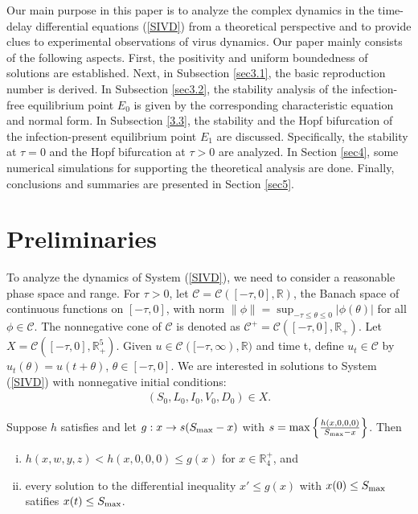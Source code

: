 \documentclass{CMHPhD-SIVD}
\begin{document}
Our main purpose in this paper is to analyze the complex dynamics in the time-delay differential equations (\ref{SIVD}) from a theoretical perspective and to provide clues to experimental observations of virus dynamics. Our paper mainly consists of the following aspects. First, the positivity and uniform boundedness of solutions are established. Next, in Subsection \ref{sec3.1}, the basic reproduction number is derived. In Subsection \ref{sec3.2}, the stability analysis of the infection-free equilibrium point $E_0$ is given by the corresponding characteristic equation and normal form. In Subsection \ref{3.3}, the stability and the Hopf bifurcation of the  infection-present equilibrium point $E_1$ are discussed. Specifically, the stability at $\tau=0$ and the Hopf bifurcation at $\tau>0$ are analyzed. In Section \ref{sec4}, some numerical simulations for supporting the theoretical analysis are done. Finally, conclusions and summaries are presented in Section \ref{sec5}.




\section{Preliminaries}
To analyze the dynamics of System (\ref{SIVD}), we need to consider a reasonable phase space and range. For $\tau>0$, let $\mathscr{C}=\mathcal{C}([-\tau,0],\mathbb{R})$, the Banach space of continuous functions on $[-\tau,0]$, with norm $\|\phi\|=\sup_{-\tau\leq\theta\leq0}|\phi(\theta)|$ for all $\phi\in\mathscr{C}$. The nonnegative cone of $\mathscr{C}$ is denoted as $\mathscr{C}^+=\mathcal{C}([-\tau,0],\mathbb{R}_+)$. Let $X=\mathcal{C}([-\tau,0],\mathbb{R}^5_+)$. Given $u\in\mathcal{C}([-\tau,\infty),\mathbb{R})$ and time t, define $u_t\in\mathscr{C}$ by $u_t(\theta) = u(t+\theta)$, $\theta\in[-\tau,0]$.
We are interested in solutions to System (\ref{SIVD}) with nonnegative initial conditions:
\begin{align*}
(S_0, L_0, I_0, V_0, D_0) \in X.
\end{align*}

\begin{lemma}\label{2.1}
Suppose $h$ satisfies 
and let $g:x\to s(S_{\text{max}}-x)$ with $s=\max\left\{\frac{h(x,0,0,0)}{S_{\text{max}}-x}\right\}$.
Then
	\begin{enumerate}[(i)]
		\item $h(x,w,y,z)<h(x, 0,0, 0)\leq g(x)$ for $x\in\mathbb{R}_4^+$, and
		\item every solution to the differential inequality $x'\leq g(x)$ with $x(0)\leq S_{\text{max}}$ satifies $x(t)\leq S_{\text{max}}$.
	\end{enumerate}
\end{lemma}
\end{document}
